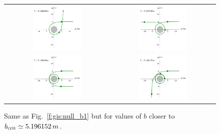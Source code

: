 \begin{figure}
\begin{tabular}{cc}
\includegraphics[width=0.48\textwidth]{ges_null_b_5_230000.pdf} &
\includegraphics[width=0.48\textwidth]{ges_null_b_5_202500.pdf} \\
\includegraphics[width=0.48\textwidth]{ges_null_b_5_196430.pdf} &
\includegraphics[width=0.48\textwidth]{ges_null_b_5_196155.pdf}
\end{tabular}
\caption[]{\label{f:gis:null_b2} \footnotesize
Same as Fig.~\ref{f:gis:null_b1} but for values of $b$ closer to
$b_{\rm crit} \simeq 5.196152\, m$.}
\end{figure}


